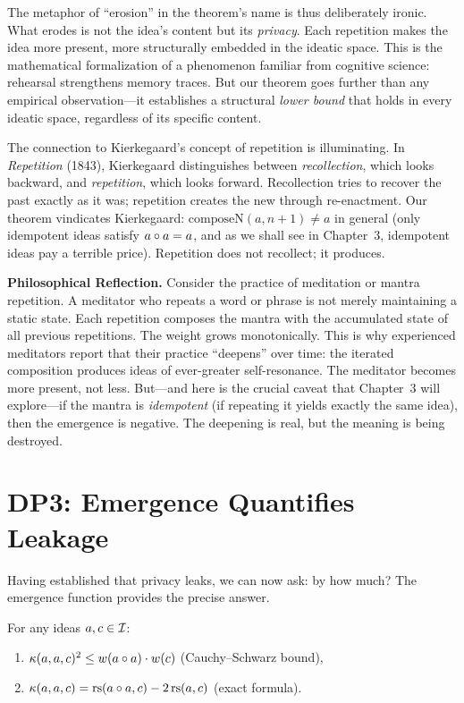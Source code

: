 The metaphor of ``erosion'' in the theorem's name is thus deliberately
ironic. What erodes is not the idea's content but its \emph{privacy}.
Each repetition makes the idea more present, more structurally embedded
in the ideatic space. This is the mathematical formalization of a
phenomenon familiar from cognitive science: rehearsal strengthens memory
traces. But our theorem goes further than any empirical observation---it
establishes a structural \emph{lower bound} that holds in every ideatic
space, regardless of its specific content.

The connection to Kierkegaard's concept of repetition is illuminating.
In \textit{Repetition} (1843), Kierkegaard distinguishes between
\emph{recollection}, which looks backward, and \emph{repetition}, which
looks forward. Recollection tries to recover the past exactly as it was;
repetition creates the new through re-enactment. Our theorem vindicates
Kierkegaard: $\mathrm{composeN}(a, n+1) \neq a$ in general (only
idempotent ideas satisfy $a \circ a = a$, and as we shall see in
Chapter~3, idempotent ideas pay a terrible price). Repetition does not
recollect; it produces.

\begin{reflectionbox}
\textbf{Philosophical Reflection.}
Consider the practice of meditation or mantra repetition. A meditator
who repeats a word or phrase is not merely maintaining a static state.
Each repetition composes the mantra with the accumulated state of all
previous repetitions. The weight grows monotonically. This is why
experienced meditators report that their practice ``deepens'' over time:
the iterated composition produces ideas of ever-greater self-resonance.
The meditator becomes more present, not less. But---and here is the
crucial caveat that Chapter~3 will explore---if the mantra is
\emph{idempotent} (if repeating it yields exactly the same idea), then
the emergence is negative. The deepening is real, but the meaning is
being destroyed.
\end{reflectionbox}

\section{DP3: Emergence Quantifies Leakage}

Having established that privacy leaks, we can now ask: by how much? The
emergence function provides the precise answer.

\begin{theorem}
\label{thm:emergence-quantifies}
For any ideas $a, c \in \mathcal{I}$:
\begin{enumerate}
\item $\kappa(a, a, c)^2 \leq w(a \circ a) \cdot w(c)$
\hfill (Cauchy--Schwarz bound),
\item $\kappa(a, a, c) = \mathrm{rs}(a \circ a, c) - 2\,\mathrm{rs}(a, c)$
\hfill (exact formula).
\end{enumerate}
\end{theorem}

